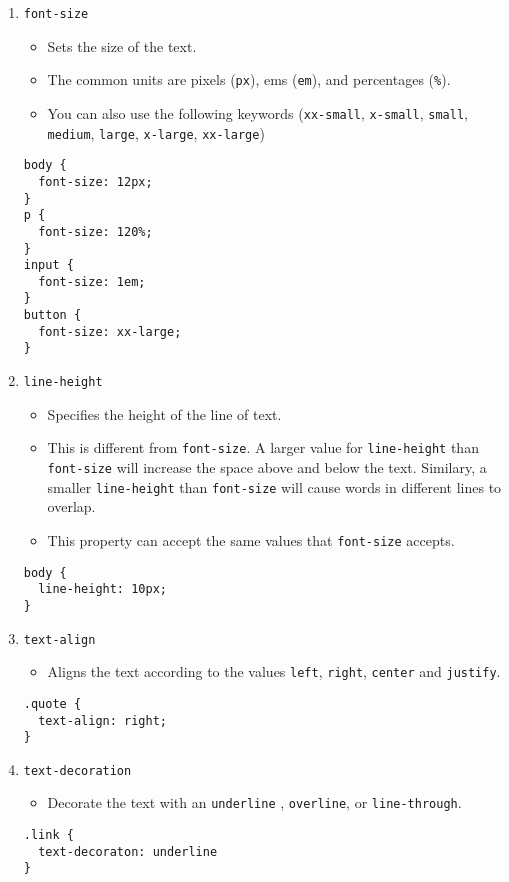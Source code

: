 \documentclass[10pt, twocolumn]{article}
\begin{document}
\begin{enumerate}
\item{\texttt{font-size}}
\begin{itemize}
    \item Sets the size of the text.  
    \item The common units are pixels (\texttt{px}), ems (\texttt{em}), and percentages (\texttt{\%}).  
    \item You can also use the following keywords (\texttt{xx-small}, \texttt{x-small}, \texttt{small}, \texttt{medium}, \texttt{large}, \texttt{x-large}, \texttt{xx-large})
\end{itemize}    
\begin{lstlisting}[frame=single]
body {
  font-size: 12px;
}
p {
  font-size: 120%;
}
input {
  font-size: 1em;
}
button {
  font-size: xx-large;
}
\end{lstlisting}
    
\item{\texttt{line-height}}
\begin{itemize}
    \item Specifies the height of the line of text.  
    \item This is different from \texttt{font-size}.  A larger value for \texttt{line-height} than \texttt{font-size} will increase the space above and below the text.  Similary, a smaller \texttt{line-height} than \texttt{font-size} will cause words in different lines to overlap.  
    \item This property can accept the same values that \texttt{font-size} accepts.
\end{itemize}    
\begin{lstlisting}[frame=single]
body {
  line-height: 10px;
}

\end{lstlisting}
    
\item{\texttt{text-align}}
\begin{itemize}
    \item Aligns the text according to the values \texttt{left}, \texttt{right}, \texttt{center} and \texttt{justify}.
\end{itemize}    
\begin{lstlisting}[frame=single]
.quote {
  text-align: right;
}
\end{lstlisting}
    
\item{\texttt{text-decoration}}
\begin{itemize}
    \item Decorate the text with an  \texttt{underline} ,  \texttt{overline}, or  \texttt{line-through}.
\end{itemize}    
\begin{lstlisting}[frame=single]
.link {
  text-decoraton: underline
}
\end{lstlisting}
    


\end{enumerate}
\end{document}
